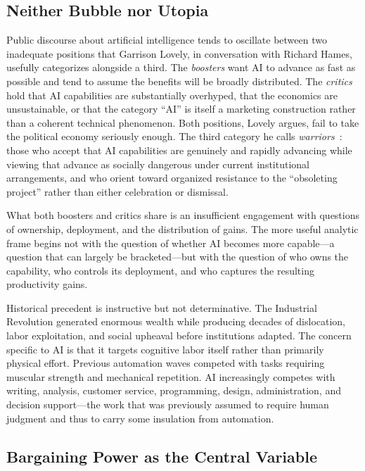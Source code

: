 \documentclass[12pt, a4paper]{article}
\theoremstyle{plain}
\theoremstyle{definition}
\theoremstyle{remark}
\begin{document}
\subsection{Neither Bubble nor Utopia}

Public discourse about artificial intelligence tends to oscillate between two
inadequate positions that Garrison Lovely, in conversation with Richard Hames,
usefully categorizes alongside a third.
The \emph{boosters} want AI to advance as fast as possible and tend to assume the
benefits will be broadly distributed.
The \emph{critics} hold that AI capabilities are substantially overhyped, that
the economics are unsustainable, or that the category ``AI'' is itself a marketing
construction rather than a coherent technical phenomenon.
Both positions, Lovely argues, fail to take the political economy seriously enough.
The third category he calls \emph{warriors}~\cite{novaralively}: those who accept that AI capabilities
are genuinely and rapidly advancing while viewing that advance as socially dangerous
under current institutional arrangements, and who orient toward organized resistance
to the ``obsoleting project'' rather than either celebration or dismissal.

What both boosters and critics share is an insufficient engagement with questions of
ownership, deployment, and the distribution of gains.
The more useful analytic frame begins not with the question of whether AI becomes
more capable---a question that can largely be bracketed---but with the question
of who owns the capability, who controls its deployment, and who captures the
resulting productivity gains.

Historical precedent is instructive but not determinative.
The Industrial Revolution generated enormous wealth while producing decades of
dislocation, labor exploitation, and social upheaval before institutions adapted.
The concern specific to AI is that it targets cognitive labor itself rather than
primarily physical effort.
Previous automation waves competed with tasks requiring muscular strength
and mechanical repetition.
AI increasingly competes with writing, analysis, customer service, programming,
design, administration, and decision support---the work that was previously
assumed to require human judgment and thus to carry some insulation from automation.

\subsection{Bargaining Power as the Central Variable}
\end{document}
